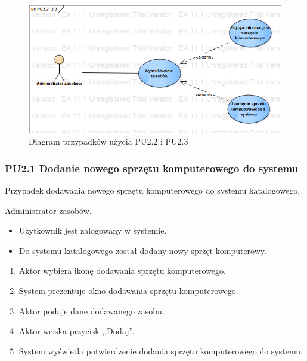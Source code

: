 \begin{figure}[h!]
	\centering
	\includegraphics[scale=0.6]{img/diagrams/useCaseDiagrams/PU2_2_2_3.png}
	\caption{Diagram przypadków użycia PU2.2 i PU2.3 \label{fig:labelUCPU2.2_2.3}}
\end{figure}

\subsubsection{PU2.1 Dodanie nowego sprzętu komputerowego do systemu}

Przypadek dodawania nowego sprzętu komputerowego do systemu katalogowego.

Administrator zasobów.

\begin{itemize}
\item Użytkownik jest zalogowany w systemie.
\end{itemize}

\begin{itemize}
\item Do systemu katalogowego został dodany nowy sprzęt komputerowy.
\end{itemize}

\begin{enumerate}
\item \label{pu2.1:1} Aktor wybiera ikonę dodawania sprzętu komputerowego.
\item System prezentuje okno dodawania sprzętu komputerowego.
\item Aktor podaje dane dodawanego zasobu.
\item \label{pu2.1:4} Aktor wciska przycisk ,,Dodaj''.
\item System wyświetla potwierdzenie dodania sprzętu komputerowego do systemu.
\end{enumerate}

